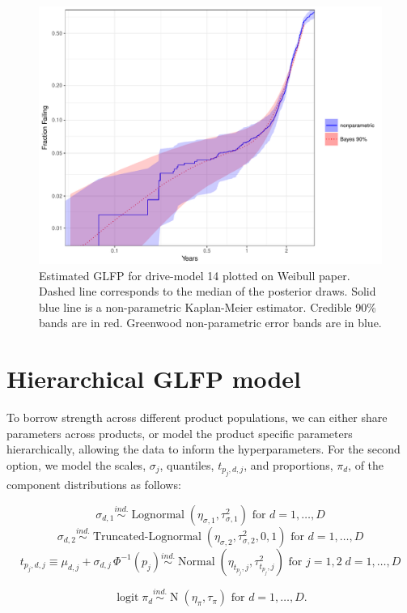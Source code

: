 \documentclass[12pt]{article}
\newcommand{\ind}{\stackrel{ind.}{\sim}}
\newcommand{\op}{\operatorname}
\begin{document}
\begin{figure}[H]
\centering
  \includegraphics[width=.9\textwidth]{fig/drive14cred.pdf}
  \caption{Estimated GLFP for drive-model 14 plotted on Weibull paper.  Dashed line corresponds to the median of the posterior draws.  Solid blue line is a non-parametric Kaplan-Meier estimator.  Credible 90\% bands are in red.  Greenwood non-parametric error bands are in blue.}
  \label{fig1}
\end{figure}


\section{Hierarchical GLFP model}
\label{sec:Hierarchical GLFP model}

To borrow strength across different product populations, we can either share parameters across products, or model the product specific parameters hierarchically, allowing the data to inform the hyperparameters. For the second option, we model the scales, $\sigma_j$, quantiles, $t_{p_j,d,j}$, and proportions, $\pi_d$, of the component distributions as follows:

$$\sigma_{d,1} \ind \op{Lognormal} \left( \eta_{\sigma,1}, \tau^2_{\sigma,1} \right) \mbox{ for } d=1,\ldots,D$$
$$\sigma_{d,2} \ind \op{Truncated-Lognormal} \left( \eta_{\sigma,2}, \tau^2_{\sigma,2} , 0, 1 \right) \mbox{ for } d=1,\ldots,D$$
$$t_{p_j,d,j} \equiv \mu_{d,j} + \sigma_{d,j}\,\Phi^{-1}(p_j)  \ind \op{Normal} \left(\eta_{t_{p_j},j}, \tau^2_{t_{p_j},j}\right) \mbox{ for } j=1,2\; d=1,\ldots,D$$

$$\op{logit} \pi_d \ind \op{N}(\eta_\pi, \tau_\pi) \mbox{ for } d=1,\ldots,D.$$
\end{document}
